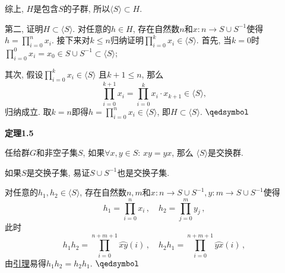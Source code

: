 \documentclass[UTF8]{ctexart}
\begin{document}
\vspace{3pt}
综上, $H$是包含$S$的子群, 所以$\langle S\rangle\subset H$.

\vspace{3pt}
第二, 证明$H\subset\langle S\rangle$. 对任意的$h\in H$,
存在自然数$n$和$x:n\to S\cup S^{-1}$使得$\displaystyle h=\prod_{i=0}^nx_i$.
接下来对$k\leqslant n$归纳证明$\displaystyle\prod_{i=0}^kx_i\in\langle S\rangle$.
首先, 当$k=0$时$\displaystyle
\prod_{i=0}^0x_i=x_0\in S\cup S^{-1}\subset\langle S\rangle$;

其次, 假设$\displaystyle\prod_{i=0}^kx_i\in\langle S\rangle$
且$k+1\leqslant n$, 那么
\[
    \prod_{i=0}^{k+1}x_i=\prod_{i=0}^kx_i\cdot x_{k+1}\in\langle S\rangle,
\]
归纳成立. 取$k=n$即得$\displaystyle h=\prod_{i=0}^nx_i\in\langle S\rangle$,
即$H\subset\langle S\rangle$. \hfill $\qedsymbol$

\vspace{13pt}

\hypertarget{sec:定理1.5}{}
\noindent\textbf{定理1.5}

任给群$G$和非空子集$S$, 如果$\forall x,y\in S:\,xy=yx$, 那么
$\langle S\rangle$是交换群.


如果$S$是交换子集, 易证$S\cup S^{-1}$也是交换子集.

对任意的$h_1,h_2\in\langle S\rangle$, 存在自然数$n,m$和$x:n\to S\cup S^{-1},
y:m\to S\cup S^{-1}$使得
\vspace{3pt}
\[
    h_1=\prod_{i=0}^nx_i\,,\quad h_2=\prod_{j=0}^my_j\,,
\]
此时
\[
    h_1h_2=\prod_{i=0}^{n+m+1}\wideparen{xy}(i)\,,\quad
    h_2h_1=\prod_{i=0}^{n+m+1}\wideparen{yx}(i)\,,
\]
由\href{../../../01 基础集合论/03 自然数/04 有限求和/01 有序求和#nameddest=sec:定理2.2}
{引理}易得$h_1h_2=h_2h_1$. \hfill $\qedsymbol$
\end{document}
